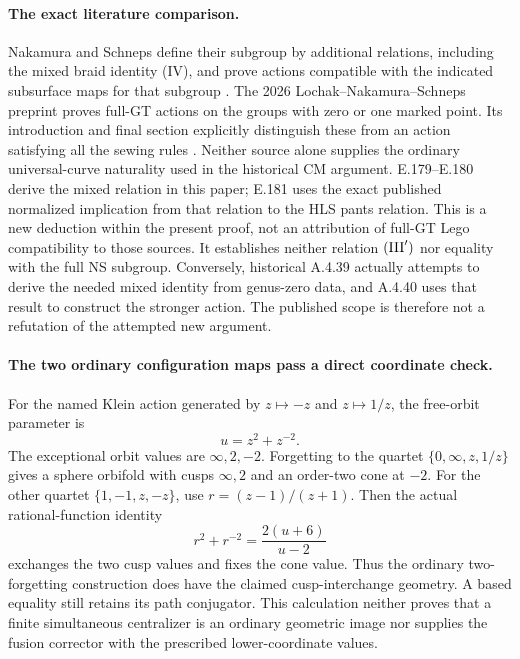 \paragraph{The exact literature comparison.}
Nakamura and Schneps define their subgroup by additional
relations, including the mixed braid identity (IV), and prove
actions compatible with the indicated subsurface maps for that
subgroup \cite[author pp.2--4, Definition~1.1 and
Theorems~1.2--1.4; pp.16--19, Definition~5.1 and Lemma~6.1]
{SymNakamuraSchneps2000}.
The 2026 Lochak--Nakamura--Schneps preprint proves full-GT
actions on the groups with zero or one marked point.  Its
introduction and final section explicitly distinguish these
from an action satisfying all the sewing rules
\cite[pp.2 and 19; Theorem~1.1]{SymLochakNakamuraSchneps2026}.
Neither source alone supplies the ordinary universal-curve
naturality used in the historical CM argument.
E.179--E.180 derive the mixed relation in this paper;
E.181 uses the exact published normalized implication
from that relation to the HLS pants relation.
This is a new deduction within the present proof, not
an attribution of full-GT Lego compatibility to those
sources.  It establishes neither relation
$({\rm III}')$ nor equality with the full NS subgroup.
Conversely,
historical A.4.39 actually attempts to derive the needed mixed
identity from genus-zero data, and A.4.40 uses that result to
construct the stronger action.  The published scope is therefore
not a refutation of the attempted new argument.

\paragraph{The two ordinary configuration maps pass a direct coordinate check.}
For the named Klein action generated by $z\mapsto-z$ and
$z\mapsto1/z$, the free-orbit parameter is
\[
             u=z^2+z^{-2}.
\]
The exceptional orbit values are $\infty,2,-2$.
Forgetting to the quartet $\{0,\infty,z,1/z\}$ gives a
sphere orbifold with cusps $\infty,2$ and an order-two cone
at $-2$.  For the other quartet $\{1,-1,z,-z\}$, use
$r=(z-1)/(z+1)$.  Then the actual rational-function identity
\[
           r^2+r^{-2}=\frac{2(u+6)}{u-2}
\]
exchanges the two cusp values and fixes the cone value.
Thus the ordinary two-forgetting construction does have the
claimed cusp-interchange geometry.  A based equality still
retains its path conjugator.  This calculation neither proves
that a finite simultaneous centralizer is an ordinary geometric
image nor supplies the fusion corrector with the prescribed
lower-coordinate values.

